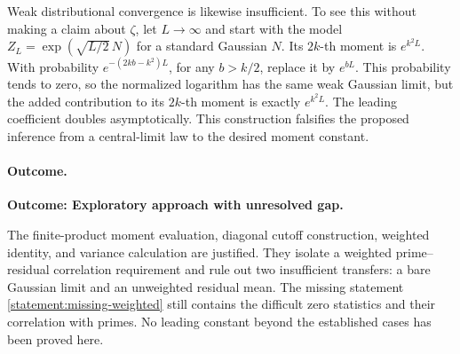 \documentclass[11pt,a4paper]{article}
\numberwithin{equation}{section}
\begin{document}
Weak distributional convergence is likewise insufficient. To see this
without making a claim about $\zeta$, let $L\to\infty$ and start with the
model $Z_L=\exp(\sqrt{L/2}\,N)$ for a standard Gaussian $N$.
Its $2k$-th moment is $e^{k^2L}$. With probability
$e^{-(2kb-k^2)L}$, for any $b>k/2$, replace it by $e^{bL}$.
This probability tends to zero, so the normalized logarithm has the same
weak Gaussian limit, but the added contribution to its $2k$-th moment
is exactly $e^{k^2L}$. The leading coefficient doubles asymptotically.
This construction falsifies the proposed inference from a central-limit
law to the desired moment constant.

\paragraph{Outcome.}
\textbf{Outcome: Exploratory approach with unresolved gap.}

The finite-product moment evaluation, diagonal cutoff construction,
weighted identity, and variance calculation are justified. They isolate
a weighted prime--residual correlation requirement and rule out two
insufficient transfers: a bare Gaussian limit and an unweighted residual
mean. The missing statement \eqref{statement:missing-weighted} still contains
the difficult zero statistics and their correlation with primes. No
leading constant beyond the established cases has been proved here.
\end{document}
